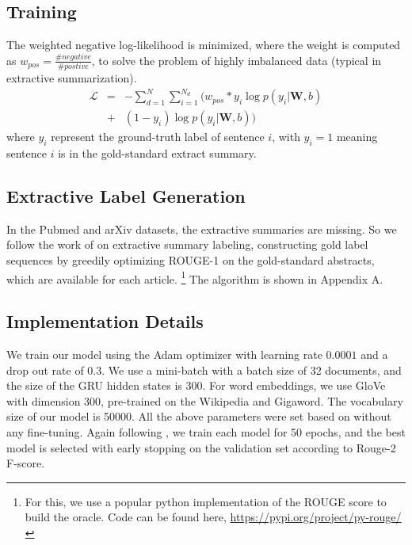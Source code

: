 \subsection{Training}
The weighted negative log-likelihood is minimized, where the weight is computed as $w_{pos} = \frac{\# negative}{\# postive}$, to solve the problem of highly imbalanced data (typical in extractive summarization).
\begin{eqnarray*}
    \mathcal{L} &=& -\sum_{d=1}^{N}\sum_{i=1}^{N_d}(w_{pos} * y_i \log p(y_i|\mathbf{W},b) \\
    &+& (1-y_i)\log p(y_i|\mathbf{W},b))
\end{eqnarray*}
where $y_i$ represent the ground-truth label of sentence $i$, with $y_i=1$ meaning  sentence $i$ is in the gold-standard extract summary. 

\subsection{Extractive Label Generation}
In the Pubmed and arXiv datasets, the extractive summaries are missing. So we follow the work of \cite{EMNLP2018} on extractive summary labeling, constructing gold label sequences by greedily optimizing ROUGE-1 on the gold-standard abstracts, which are available for each article. \footnote{For this, we use a popular python implementation of the ROUGE score to build the oracle. Code can be found here, \url{https://pypi.org/project/py-rouge/}} The algorithm is shown in Appendix A.
\subsection{Implementation Details}
We train our model using the Adam optimizer \cite{adam} with learning rate $0.0001$ and a drop out rate of 0.3. We use a mini-batch with a batch size of 32 documents, and the size of the GRU hidden states is 300. For word embeddings, we use GloVe \cite{glove} with dimension 300, pre-trained on the Wikipedia and Gigaword. The vocabulary size of our model is 50000. All the above parameters were set based on \cite{EMNLP2018} without any fine-tuning. Again following \cite{EMNLP2018}, we train each model for 50 epochs, and the best model is selected with early stopping on the validation set according to Rouge-2 F-score.
